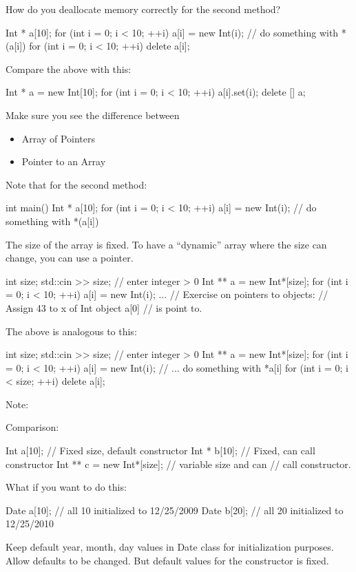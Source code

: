 How do you deallocate memory correctly for the second method?

\begin{console}
Int * a[10];
for (int i = 0; i < 10; ++i)
    a[i] = new Int(i);
// do something with *(a[i])
for (int i = 0; i < 10; ++i)
    delete a[i];
\end{console}
Compare the above with this:
\begin{console}
Int * a = new Int[10];
for (int i = 0; i < 10; ++i)
    a[i].set(i);
delete [] a;
\end{console}
Make sure you see the difference between

\begin{itemize}
\item
  Array of Pointers
\item
  Pointer to an Array
\end{itemize}

Note that for the second method:

\begin{console}
int main()
{   
    Int * a[10];
    for (int i = 0; i < 10; ++i)
        a[i] = new Int(i);
    // do something with *(a[i])
}
\end{console}
The size of the array is fixed. To have a ``dynamic'' array where the
size can change, you can use a pointer.
\begin{console}
int size;
std::cin >> size; // enter integer > 0
Int ** a = new Int*[size];
for (int i = 0; i < 10; ++i)
    a[i] = new Int(i);
...
// Exercise on pointers to objects:
// Assign 43 to x of Int object a[0]
// is point to.
\end{console}
The above is analogous to this:
\begin{console}
int size;
std::cin >> size; // enter integer > 0
Int ** a = new Int*[size];
for (int i = 0; i < 10; ++i)
    a[i] = new Int(i);
    // ... do something with *a[i]
for (int i = 0; i < size; ++i)
    delete a[i];
\end{console}
Note:
Comparison:
\begin{console}
Int a[10];        // Fixed size, default constructor
Int * b[10];      // Fixed, can call constructor
Int ** c = new Int*[size]; // variable size and can
                           // call constructor.
\end{console}
What if you want to do this:
\begin{console}
Date a[10]; // all 10 initialized to 12/25/2009
Date b[20]; // all 20 initialized to 12/25/2010
\end{console}
Keep default year, month, day values in Date class for initialization
purposes. Allow defaults to be changed. But default values for the
constructor is fixed.

